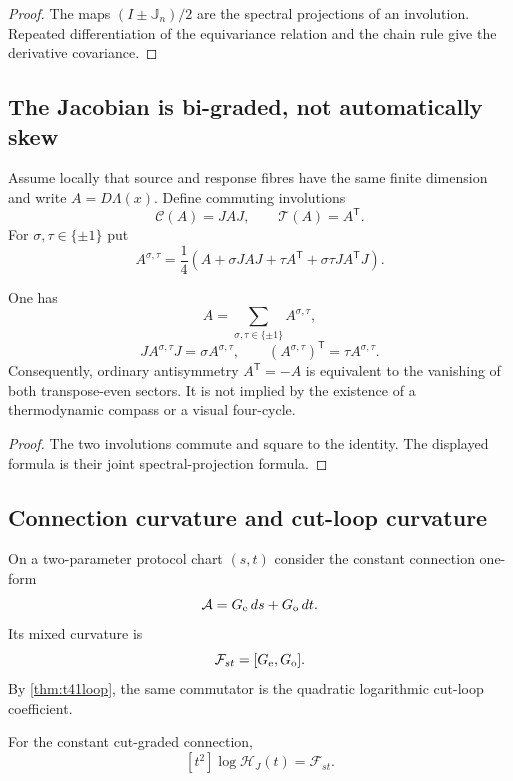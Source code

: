 \begin{proof}
The maps $(I\pm\mathbb J_n)/2$ are the spectral projections of an involution. Repeated differentiation of the equivariance relation and the chain rule give the derivative covariance.
\end{proof}

\subsection{The Jacobian is bi-graded, not automatically skew}

Assume locally that source and response fibres have the same finite dimension and write $A=D\Lambda(x)$. Define commuting involutions
\[
 \mathcal C(A)=JAJ,
 \qquad
 \mathcal T(A)=A^{\mathsf T}.
\]
For $\sigma,\tau\in\{\pm1\}$ put
\[
 A^{\sigma,\tau}
 =\frac14\left(A+\sigma JAJ+\tau A^{\mathsf T}
 +\sigma\tau JA^{\mathsf T}J\right).
\]

\begin{theorem}
One has
\[
 A=\sum_{\sigma,\tau\in\{\pm1\}}A^{\sigma,\tau},
\]
\[
 JA^{\sigma,\tau}J=\sigma A^{\sigma,\tau},
 \qquad
 (A^{\sigma,\tau})^{\mathsf T}=\tau A^{\sigma,\tau}.
\]
Consequently, ordinary antisymmetry $A^{\mathsf T}=-A$ is equivalent to the vanishing of both transpose-even sectors. It is not implied by the existence of a thermodynamic compass or a visual four-cycle.
\end{theorem}

\begin{proof}
The two involutions commute and square to the identity. The displayed formula is their joint spectral-projection formula.
\end{proof}

\subsection{Connection curvature and cut-loop curvature}

On a two-parameter protocol chart $(s,t)$ consider the constant connection one-form
\[
 \mathcal A=G_{\mathrm e}\,ds+G_{\mathrm o}\,dt.
\]
Its mixed curvature is
\[
 \mathcal F_{st}=[G_{\mathrm e},G_{\mathrm o}].
\]
By \cref{thm:t41loop}, the same commutator is the quadratic logarithmic cut-loop coefficient.

\begin{corollary}
For the constant cut-graded connection,
\[
 [t^2]\log\mathscr H_J(t)=\mathcal F_{st}.
\]
\end{corollary}

